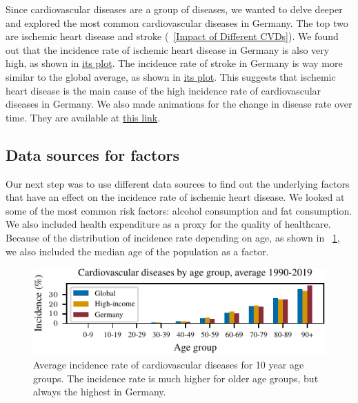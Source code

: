 Since cardiovascular diseases are a group of diseases, we wanted to delve deeper and explored the most common cardiovascular diseases in Germany. The top two are ischemic heart disease and stroke (\figurename~\ref{Impact of Different CVDs}). 
We found out that the incidence rate of ischemic heart disease in Germany is also very high, as shown in \href{https://github.com/sykoravojtech/IHD_germany_2024/blob/main/doc/IHD_germany_2024/fig/fig_ischemic_rate.pdf}{its plot}.
The incidence rate of stroke in Germany is way more similar to the global average, as shown in \href{https://github.com/sykoravojtech/IHD_germany_2024/blob/main/doc/IHD_germany_2024/fig/fig_stroke_rate.pdf}{its plot}. This suggests that ischemic heart disease is the main cause of the high incidence rate of cardiovascular diseases in Germany.
We also made animations for the change in disease rate over time. They are available at \href{https://github.com/sykoravojtech/IHD_germany_2024/tree/main/exp/output/animations}{this link}.




\subsection{Data sources for factors}\label{sec:data_sources}

Our next step was to use different data sources to find out the underlying factors that have an effect on the incidence rate of ischemic heart disease. We looked at some of the most common risk factors: alcohol consumption and fat consumption. We also included health expenditure as a proxy for the quality of healthcare. Because of the 
distribution of incidence rate depending on age, as shown in \figurename~\ref{Cardiovascular diseases for age groups}, we also included the median age of the population as a factor.

\begin{figure}[h]
    \vskip 0.2in
    \begin{center}
    \centerline{\includegraphics[width=\columnwidth]{fig/fig_cardiovascular_disease_agerange.pdf}}
    \caption{Average incidence rate of cardiovascular diseases for 10 year age groups. The incidence rate is much higher for older age groups, but 
    always the highest in Germany.}
    \label{Cardiovascular diseases for age groups}
    \end{center}
    \vskip -0.2in
\end{figure}


